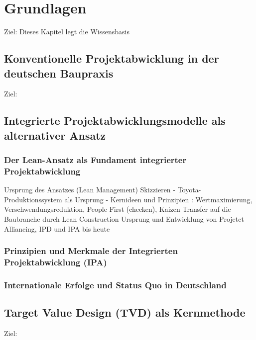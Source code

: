 \chapter{Grundlagen}
\label{ch:grundlagen}
Ziel: Dieses Kapitel legt die Wissensbasis

\section{Konventionelle Projektabwicklung in der deutschen Baupraxis}
\label{sec: 2.1}
Ziel:

\clearpage

\section{Integrierte Projektabwicklungsmodelle als alternativer Ansatz}
\label{sec: 2.2}

\subsection{Der Lean-Ansatz als Fundament integrierter Projektabwicklung}
\label{sec:2.2.1}

Ursprung des Ansatzes (Lean Management) Skizzieren
- Toyota-Produktionssystem\autocite[]{ohno_toyota-produktionssystem_2013} als Ursprung
- Kernideen und Prinzipien : Wertmaximierung, Verschwendungsreduktion, People First (checken), Kaizen
Transfer auf die Baubranche durch Lean Construction
Ursprung und Entwicklung von Projetct Alliancing, IPD und IPA bis heute

\subsection{Prinzipien und Merkmale der Integrierten Projektabwicklung (IPA)}
\label{sec:2.2.2}

\subsection{Internationale Erfolge und Status Quo in Deutschland}
\label{sec:2.2.3}

\clearpage

\section{Target Value Design (TVD) als Kernmethode}
\label{sec: 2.3}
Ziel: